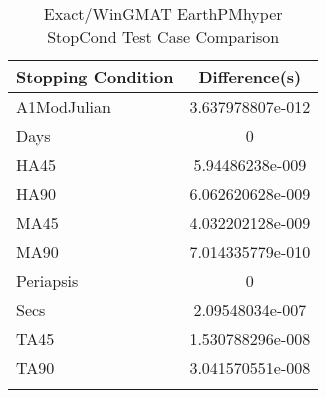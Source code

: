 \begin{table}[htbp!]
\centering
\caption{ Exact/WinGMAT EarthPMhyper StopCond Test Case Comparison}
      \begin{tabular}{lc}
      \hline\hline
          Stopping Condition & Difference(s) \\
         \hline
         A1ModJulian & 3.637978807e-012 \\
         Days & 0 \\
         HA45 & 5.94486238e-009 \\
         HA90 & 6.062620628e-009 \\
         MA45 & 4.032202128e-009 \\
         MA90 & 7.014335779e-010 \\
         Periapsis & 0 \\
         Secs & 2.09548034e-007 \\
         TA45 & 1.530788296e-008 \\
         TA90 & 3.041570551e-008 \\
      \hline\hline
      \label{Table: Exact-WinGMAT EarthPMhyper StopCond Table} 
\end{tabular}
\end{table}
